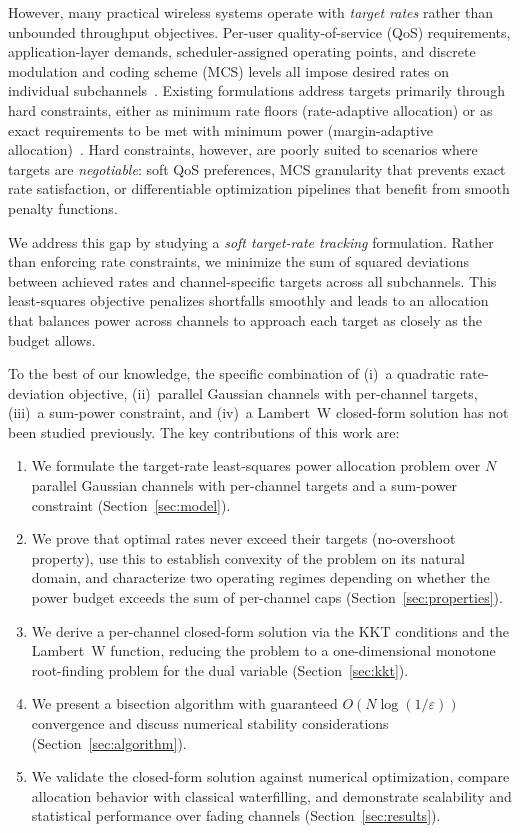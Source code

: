 \documentclass[journal]{IEEEtran}
\begin{document}
However, many practical wireless systems operate with \emph{target rates} rather than unbounded throughput objectives.
Per-user quality-of-service (QoS) requirements, application-layer demands, scheduler-assigned operating points, and discrete modulation and coding scheme (MCS) levels all impose desired rates on individual subchannels~\cite{wong1999multiuserofdm,huangberry2009chapter}.
Existing formulations address targets primarily through hard constraints, either as minimum rate floors (rate-adaptive allocation) or as exact requirements to be met with minimum power (margin-adaptive allocation)~\cite{chow1995dmt,sadr2009survey}.
Hard constraints, however, are poorly suited to scenarios where targets are \emph{negotiable}: soft QoS preferences, MCS granularity that prevents exact rate satisfaction, or differentiable optimization pipelines that benefit from smooth penalty functions.

We address this gap by studying a \emph{soft target-rate tracking} formulation.
Rather than enforcing rate constraints, we minimize the sum of squared deviations between achieved rates and channel-specific targets across all subchannels.
This least-squares objective penalizes shortfalls smoothly and leads to an allocation that balances power across channels to approach each target as closely as the budget allows.

To the best of our knowledge, the specific combination of (i)~a quadratic rate-deviation objective, (ii)~parallel Gaussian channels with per-channel targets, (iii)~a sum-power constraint, and (iv)~a Lambert~W closed-form solution has not been studied previously.
The key contributions of this work are:
\begin{enumerate}
\item We formulate the target-rate least-squares power allocation problem over $N$ parallel Gaussian channels with per-channel targets and a sum-power constraint (Section~\ref{sec:model}).
\item We prove that optimal rates never exceed their targets (no-overshoot property), use this to establish convexity of the problem on its natural domain, and characterize two operating regimes depending on whether the power budget exceeds the sum of per-channel caps (Section~\ref{sec:properties}).
\item We derive a per-channel closed-form solution via the KKT conditions and the Lambert~W function, reducing the problem to a one-dimensional monotone root-finding problem for the dual variable (Section~\ref{sec:kkt}).
\item We present a bisection algorithm with guaranteed $O(N\log(1/\varepsilon))$ convergence and discuss numerical stability considerations (Section~\ref{sec:algorithm}).
\item We validate the closed-form solution against numerical optimization, compare allocation behavior with classical waterfilling, and demonstrate scalability and statistical performance over fading channels (Section~\ref{sec:results}).
\end{enumerate}
\end{document}
